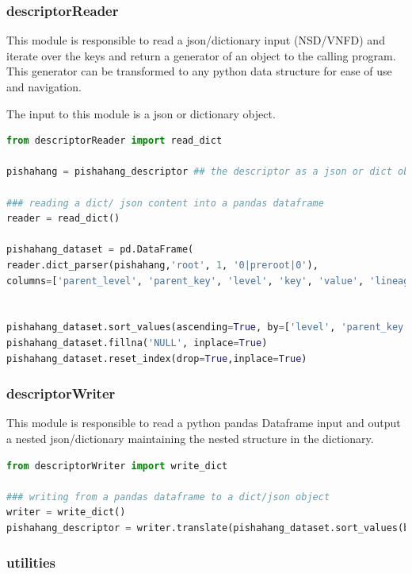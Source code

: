 \subsubsection{descriptorReader}

This module is responsible to read a json/dictionary input (NSD/VNFD) and iterate over the keys and return a generator of an object to the calling program. This generator can be transformed to any python data structure for ease of use and navigation. 

The input to this module is a json or dictionary object.

\begin{lstlisting}[language=Python]
from descriptorReader import read_dict

pishahang = pishahang_descriptor ## the descriptor as a json or dict object

### reading a dict/ json content into a pandas dataframe
reader = read_dict()

pishahang_dataset = pd.DataFrame(
reader.dict_parser(pishahang,'root', 1, '0|preroot|0'), 
columns=['parent_level', 'parent_key', 'level', 'key', 'value', 'lineage'])


pishahang_dataset.sort_values(ascending=True, by=['level', 'parent_key'],inplace=True)
pishahang_dataset.fillna('NULL', inplace=True)
pishahang_dataset.reset_index(drop=True,inplace=True)

\end{lstlisting}
\subsubsection{descriptorWriter}

This module is responsible to read a python pandas Dataframe input and output a nested json/dictionary maintaining the nested structure in the dictionary.

\begin{lstlisting}[language=Python]
from descriptorWriter import write_dict

### writing from a pandas dataframe to a dict/json object
writer = write_dict()
pishahang_descriptor = writer.translate(pishahang_dataset.sort_values(by='lineage'))

\end{lstlisting}

\subsubsection{utilities}


